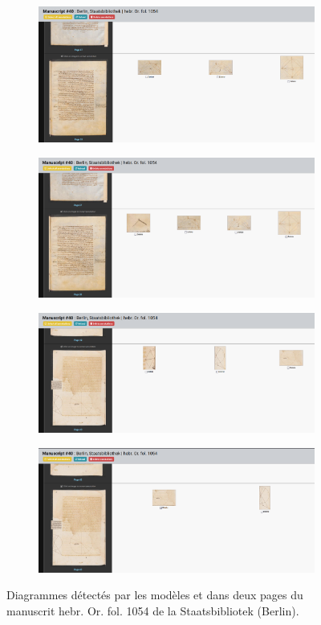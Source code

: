 	\begin{figure}[H]
		\begin{subfigure}{1\linewidth}
			\centering
			\includegraphics[width=10cm]{images/ms40_p28_docext.png}
		\end{subfigure}
		\hspace{1pt}
		\begin{subfigure}{1\linewidth}
			\centering
			\includegraphics[width=10cm]{images/ms40_p28_yolov5.png}
		\end{subfigure}
		\begin{subfigure}{1\linewidth}
			\centering
			\includegraphics[width=10cm]{images/ms40_p45_docext.png}
		\end{subfigure}
		\hspace{1pt}
		\begin{subfigure}{1\linewidth}
			\centering
			\includegraphics[width=10cm]{images/ms40_p45_yolov5.png}
		\end{subfigure}
		\caption{Diagrammes détectés par les modèles \yolov et \docex dans deux pages du manuscrit hebr. Or. fol. 1054 de la Staatsbibliotek (Berlin).}
		\label{fig:performances_modeles}
	\end{figure}


